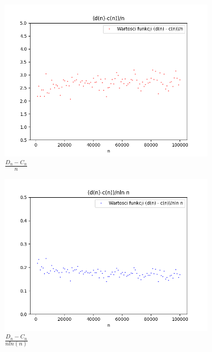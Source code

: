 \documentclass{report}
\begin{document}
    \begin{figure}[H]
        \centering
        \begin{subfigure}{.5\textwidth}
          \centering
          \includegraphics[width=1.1\linewidth]{plotdn-cnfunc1.png}
          \caption{\( \frac{D_n-C_n}{n} \)}
          \label{fig:plotdncnfunc1}
        \end{subfigure}%
        \begin{subfigure}{.5\textwidth}
          \centering
          \includegraphics[width=1.1\linewidth]{plotdn-cnfunc2.png}
          \caption{\( \frac{D_n-C_n}{nln(n)} \)}
          \label{fig:plotdncnfunc2}
        \end{subfigure}
        \begin{subfigure}{.5\textwidth}

\end{subfigure}
\end{figure}
\end{document}
